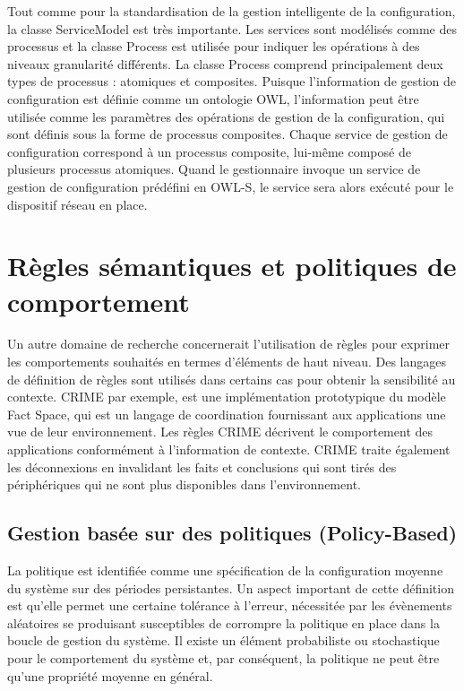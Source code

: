 Tout comme pour la standardisation de la gestion intelligente de la
configuration, la classe ServiceModel est très importante. Les services sont
modélisés comme des processus et la classe Process est utilisée pour indiquer
les opérations à des niveaux granularité différents. La classe Process comprend
principalement deux types de processus : atomiques et composites. Puisque
l'information de gestion de configuration est définie comme un ontologie OWL,
l'information peut être utilisée comme les paramètres des opérations de gestion
de la configuration, qui sont définis sous la forme de processus composites.
Chaque service de gestion de configuration correspond à un processus composite,
lui-même composé de plusieurs processus atomiques. Quand le gestionnaire invoque
un service de gestion de configuration prédéfini en OWL-S, le service sera alors
exécuté pour le dispositif réseau en place.

\section{Règles sémantiques et politiques de comportement}

Un autre domaine de recherche concernerait l'utilisation de règles pour exprimer
les comportements souhaités en termes d'éléments de haut niveau. Des langages
de définition de règles sont utilisés dans certains cas pour obtenir la
sensibilité au contexte. CRIME \cite{murphy_coordination_2007} par exemple, est
une implémentation prototypique du modèle Fact Space, qui est un langage de
coordination fournissant aux applications une vue de leur environnement. Les
règles CRIME décrivent le comportement des applications conformément à
l'information de contexte. CRIME traite également les déconnexions en invalidant
les faits et conclusions qui sont tirés des périphériques qui ne sont plus
disponibles dans l'environnement.

\subsection{Gestion basée sur des politiques (Policy-Based)}

La politique est identifiée comme une spécification de la configuration moyenne
du système sur des périodes persistantes. Un aspect important de cette
définition est qu'elle permet une certaine tolérance à l'erreur, nécessitée par
les évènements aléatoires se produisant susceptibles de corrompre la politique
en place dans la boucle de gestion du système. Il existe un élément probabiliste
ou stochastique pour le comportement du système et, par conséquent, la politique
ne peut être qu'une propriété moyenne en général.

